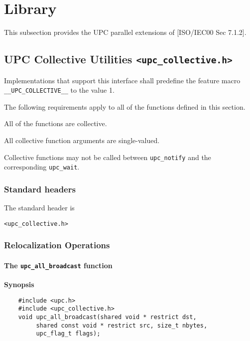 \pagebreak
\section{Library}

\npf This subsection provides the UPC parallel extensions of
    [ISO/IEC00 Sec 7.1.2].
\subsection{UPC Collective Utilities {\tt <upc\_collective.h>}}
\label{upc-collective}

\npf Implementations that support this interface shall predefine the
    feature macro {\tt \_\_UPC\_COLLECTIVE\_\_} to the value 1.

\np The following requirements apply to all of the functions defined
in this section.

\np All of the functions are collective.

\np All collective function arguments are single-valued.

\np Collective functions may not be called between {\tt upc\_notify}
and the corresponding {\tt upc\_wait}.

\subsubsection{Standard headers}

\np The standard header is

{\tt <upc\_collective.h>}

\subsubsection{Relocalization Operations}

\paragraph{The {\tt upc\_all\_broadcast} function}

{\bf Synopsis} 

\npf\vspace{-2.5em}
\begin{verbatim}
    #include <upc.h>
    #include <upc_collective.h>
    void upc_all_broadcast(shared void * restrict dst, 
         shared const void * restrict src, size_t nbytes, 
         upc_flag_t flags);
\end{verbatim}

